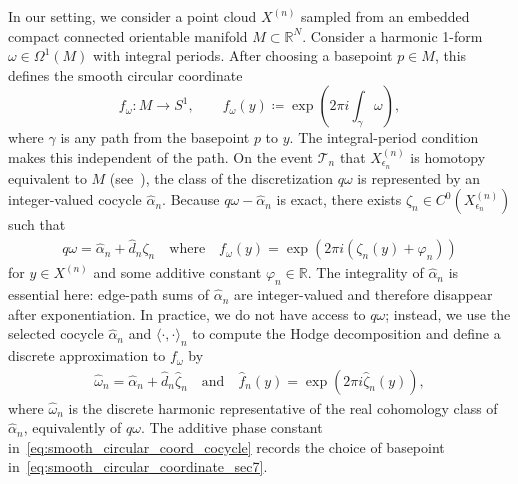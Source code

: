 \documentclass[11pt,reqno]{amsproc}
\numberwithin{equation}{section}
\newcommand{\R}{\mathbb{R}}
\newcommand{\cT}{\mathcal{T}}
\newcommand{\hzeta}{\hat{\zeta}}
\newcommand{\homega}{\hat{\omega}}
\newcommand{\andd}{\quad \text{and} \quad}
\theoremstyle{definition}
\theoremstyle{plain}
\begin{document}
    In our setting, we consider a point cloud $X^{(n)}$ sampled from an embedded compact connected orientable manifold $M \subset \R^N$. Consider a harmonic 1-form $\omega \in \Omega^1(M)$ with integral periods. After choosing a basepoint $p \in M$, this defines the smooth circular coordinate
    \begin{equation} \label{eq:smooth_circular_coordinate_sec7}
        f_\omega : M \to S^1, \qquad f_\omega(y)\coloneqq \exp\left(2\pi i\int_\gamma \omega\right),
    \end{equation}
    where $\gamma$ is any path from the basepoint $p$ to $y$. The integral-period condition makes this independent of the path. On the event $\cT_n$ that $X^{(n)}_{\epsilon_n}$ is homotopy equivalent to $M$ (see~), the class of the discretization $q\omega$ is represented by an integer-valued cocycle $\hat{\alpha}_n$. Because $q\omega - \hat{\alpha}_n$ is exact, there exists $\zeta_n \in C^0(X^{(n)}_{\epsilon_n})$ such that \label{not:topology_event}
    \begin{align} \label{eq:smooth_circular_coord_cocycle}
        q\omega = \hat{\alpha}_n + \hat{d}_n \zeta_n \quad \text{where} \quad f_\omega(y) = \exp\left(2 \pi i\left(\zeta_n(y)+\varphi_n\right)\right)
    \end{align}
    for $y \in X^{(n)}$ and some additive constant $\varphi_n\in\R$. The integrality of $\hat{\alpha}_n$ is essential here: edge-path sums of $\hat{\alpha}_n$ are integer-valued and therefore disappear after exponentiation. In practice, we do not have access to $q\omega$; instead, we use the selected cocycle $\hat{\alpha}_n$ and $\langle \cdot , \cdot \rangle_n$ to compute the Hodge decomposition and define a discrete approximation to $f_\omega$ by
    \begin{align}
        \homega_n = \hat{\alpha}_n + \hat{d}_n \hat{\zeta}_n  \andd \hat{f}_n(y) = \exp\left( 2 \pi i \hzeta_n(y)  \right),
    \end{align}
    where $\homega_n$ is the discrete harmonic representative of the real cohomology class of $\hat{\alpha}_n$, equivalently of $q\omega$. The additive phase constant in~\eqref{eq:smooth_circular_coord_cocycle} records the choice of basepoint in~\eqref{eq:smooth_circular_coordinate_sec7}. 
\end{document}
